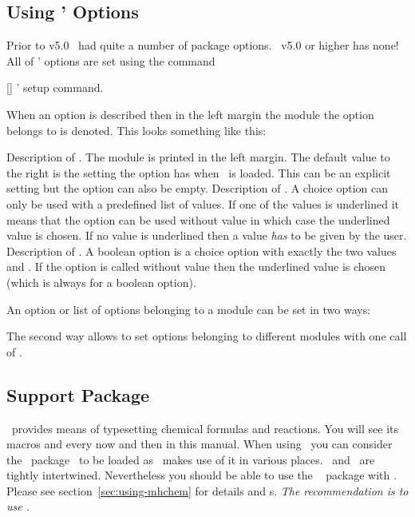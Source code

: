 \documentclass{chemmacros-manual}
\makeatletter
\def\chemmodule*#1{\textquotedblleft#1\textquotedblright}%
\renewenvironment{commands}
  {%
    \let\command\cnltx@command
    \let\explcommand\cnltx@explcommand
    \cnltxlist
  }
  {\endcnltxlist}
\makeatother
\begin{document}
\subsection{Using \chemmacros' Options}\label{sec:using-chemm-opti}
Prior to v5.0 \chemmacros\ had quite a number of package options.
\chemmacros\ v5.0 or higher has none!  All of \chemmacros' options are set
using the command
\begin{commands}
  \command{chemsetup}[]
    \chemmacros' setup command.
\end{commands}

When an option is described then in the left margin the module the option
belongs to is denoted.  This looks something like this:
\begin{options}
  \Default
    Description of . The module is printed in the left margin.
    The default value to the right is the setting the option has when
    \chemmacros\ is loaded.  This can be an explicit setting but the option
    can also be empty.
    Description of .  A choice option can only be used
    with a predefined list of values. If one of the values is underlined it
    means that the option can be used without value in which case the
    underlined value is chosen.  If no value is underlined then a value
    \emph{has} to be given by the user.
    Description of .  A boolean option is a choice
    option with exactly the two values  and .  If the
    option is called without value then the underlined value is chosen (which
    is always  for a boolean option).
\end{options}

An option or list of options belonging to a module  can be
set in two ways:
\begin{sourcecode}
\end{sourcecode}
The second way allows to set options belonging to different modules with one
call of .

\subsection{Support Package \chemformula}
\chemformula\ provides means of typesetting chemical formulas and reactions.
You will see its macros  and  every now and then in this
manual.  When using \chemmacros\ you can consider the \chemformula\
package~\cite{pkg:chemformula} to be loaded as \chemmacros\ makes use of it in
various places.  \chemmacros\ and \chemformula\ are tightly intertwined.
Nevertheless you should be able to use the \pkg{mhchem}~\cite{pkg:mhchem}
package with \chemmacros. Please see section~\vref{sec:using-mhchem} for
details and \latin{caveat}s.  \emph{The recommendation is to use
  \chemformula.}
\end{document}
